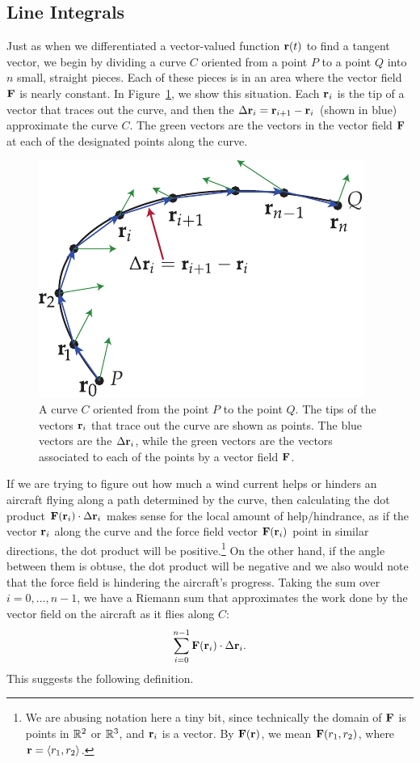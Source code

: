 

\subsection*{Line Integrals}

Just as when we differentiated a vector-valued function $\mathbf{r}(t)$ to
find a tangent vector, we begin by dividing a curve $C$ oriented from
a point $P$ to a point $Q$ into $n$ small, straight pieces. Each of
these pieces is in an area where the vector field $\mathbf{F}$ is nearly
constant. In Figure~\ref{fig:12.2.curve-vectors}, we show this
situation. Each $\mathbf{r}_i$ is the tip of a vector that traces out the
curve, and then the $\Delta\mathbf{r}_i = \mathbf{r}_{i+1}-\mathbf{r}_i$ (shown in blue)
approximate the curve $C$. The green vectors are the vectors in the
vector field $\mathbf{F}$ at each of the designated points along the curve.

\begin{figure}[h]
  \centering
  \includegraphics[width=0.45\linewidth]{figures/fig_12_2_curve_vec_field.pdf}
  \caption{A curve $C$ oriented from the point $P$ to the point
    $Q$. The tips of the vectors $\mathbf{r}_i$ that trace out the curve are
    shown as points. The blue vectors are the $\Delta\mathbf{r}_i$, while the
  green vectors are the vectors associated to each of the points by a
  vector field $\mathbf{F}$.}
  \label{fig:12.2.curve-vectors}
\end{figure}

If we are trying to figure out how much a wind current helps or
hinders an aircraft flying along a path determined by the curve, then
calculating the dot product $\mathbf{F}(\mathbf{r}_i)\cdot \Delta\mathbf{r}_i$ makes sense for
the local amount of help/hindrance, as if the vector $\mathbf{r}_i$ along the
curve and the force field vector $\mathbf{F}(\mathbf{r}_i)$ point in similar
directions, the dot product will be positive.\footnote{We are abusing
  notation here a tiny bit, since technically the domain of $\mathbf{F}$ is
  points in $\mathbb{R}^2$ or $\mathbb{R}^3$, and $\mathbf{r}_i$ is a vector. By $\mathbf{F}(\mathbf{r})$,
  we mean $\mathbf{F}(r_1,r_2)$, where $\mathbf{r}= \langle r_1,r_2\rangle$.} On the other hand, if
the angle between them is obtuse, the dot product will be negative and
we also would note that the force field is hindering the aircraft's
progress. Taking the sum over $i=0,\dots,n-1$, we have a Riemann sum
that approximates the work done by the vector field on the aircraft as
it flies along $C$:
\[\sum_{i=0}^{n-1}\mathbf{F}(\mathbf{r}_i)\cdot\Delta \mathbf{r}_i.\]
This suggests the following definition.


